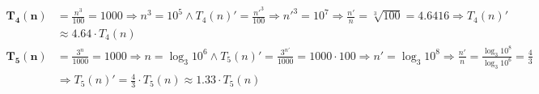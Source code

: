 \documentclass{article}
\begin{document}
\begin{flushleft}
\begin{align*}
    \bm{T_4(n)} &= \frac{n^3}{100} = 1000 \Longrightarrow n^3 = 10^5 \land T_4(n)' = \frac{n'^3}{100} \Longrightarrow n'^3 = 10^7 
    \Longrightarrow \frac{n'}{n} = \sqrt[3]{100} = 4.6416 \Longrightarrow T_4(n)' \\
    & \approx 4.64 \cdot T_4(n) \\
    \bm{T_5(n)} &= \frac{3^n}{1000} = 1000 \Longrightarrow n = \log_3 10^6 \land T_5(n)' = \frac{3^{n'}}{1000} = 1000 \cdot 100 \Longrightarrow n' = \log_3 10^8
    \Longrightarrow \frac{n'}{n} = \frac{\log_3 10^8}{\log_3 10^6} = \frac{4}{3} \\
    & \Longrightarrow T_5(n)' = \frac{4}{3} \cdot T_5(n) \approx 1.33 \cdot T_5(n)
\end{align*}
\end{flushleft}
\end{document}
